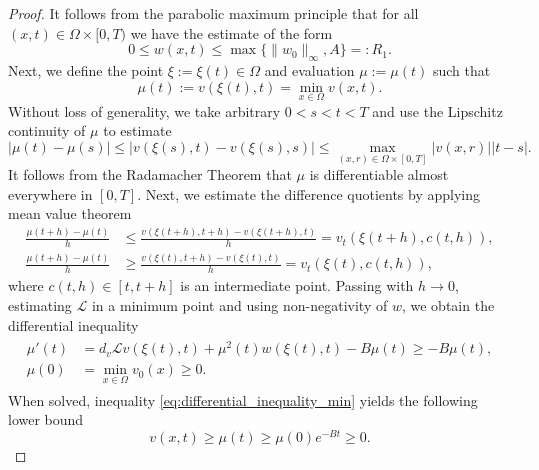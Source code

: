 \documentclass[11pt, a4paper]{article}
\theoremstyle{break}
\theoremstyle{break}
\theoremstyle{break}
\theoremstyle{break}
\theoremstyle{break}
\theoremstyle{break}
\theoremstyle{break}
\theoremstyle{break}
\theoremstyle{break}
\begin{document}
\begin{proof}
    It follows from the parabolic maximum principle that for all $(x, t) \in \Omega \times [0, T)$ we have the estimate of the form
    \begin{equation}
        \label{EQ:AprioriEstimate_V}
        0 \leq w(x, t) \leq \max\{\|w_0\|_\infty, A\} =: R_1.
    \end{equation}
    Next, we define the point $\xi := \xi(t) \in \Omega$ and evaluation $\mu := \mu(t)$ such that 
    \begin{equation*}
        \mu(t) := v(\xi(t), t) = \min_{x \in \Omega} v(x, t).
    \end{equation*}
    Without loss of generality, we take arbitrary $0 < s < t < T$ and use the 
    Lipschitz continuity of $\mu$ to estimate
    \begin{equation*}
        \left|\mu(t) - \mu(s)\right| \leq \left|v(\xi(s), t) - v(\xi(s), s)\right| \leq \max_{(x, r) \in \Omega \times [0, T]} |v(x, r)| |t-s|.
    \end{equation*}
    It follows from the Radamacher Theorem \cite[Theorem 3.2]{EvansGariepy2015} that $\mu$ is differentiable almost everywhere in $[0, T]$. Next, we estimate the difference quotients by applying mean value theorem
    \begin{align*}
        \frac{\mu(t+h) - \mu(t)}{h} &\leq \frac{v(\xi(t+h), t+h) - v(\xi(t + h), t)}{h} = v_t(\xi(t + h), c(t, h)), \\
        \frac{\mu(t+h) - \mu(t)}{h} &\geq \frac{v(\xi(t), t+h) - v(\xi(t), t)}{h} = v_t(\xi(t), c(t, h)),
    \end{align*}
    where $c(t,h) \in [t, t+h]$ is an intermediate point. Passing with $h \rightarrow 0$, estimating $\mathcal{L}$ in a minimum point and using non-negativity of $w$, we obtain the differential inequality
    \begin{align}
        \label{eq:differential_inequality_min}
        \begin{split}
            \mu'(t) &= d_v \mathcal{L} v(\xi(t), t) + \mu^2(t) w(\xi(t), t) - B \mu(t) \geq - B \mu(t), \\
            \mu(0) &= \min_{x \in \Omega} v_0(x) \geq 0.
        \end{split}
    \end{align}
    When solved, inequality \eqref{eq:differential_inequality_min} yields the following lower bound 
    \begin{equation*}
        v(x,t) \geq \mu(t) \geq \mu(0) e^{-B t} \geq 0.
    \end{equation*}

\end{proof}
\end{document}
